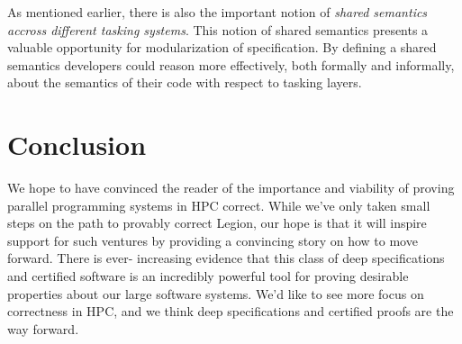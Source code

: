 \documentclass[sigconf]{acmart}
\begin{document}
As mentioned earlier, there is also the important notion of \emph{shared
semantics accross different tasking systems}. This notion of shared semantics
presents a valuable opportunity for modularization of specification. By defining
a shared semantics developers could reason more effectively, both formally and
informally, about the semantics of their code with respect to tasking layers.

\section{Conclusion}

We hope to have convinced the reader of the importance and viability of proving
parallel programming systems in HPC correct. While we've only taken small steps
on the path to provably correct Legion, our hope is that it will inspire
support for such ventures by providing a convincing story on how to move
forward. There is ever- increasing evidence that this class of deep
specifications and certified software is an incredibly powerful tool for
proving desirable properties about our large software systems. We'd like to see
more focus on correctness in HPC, and we think deep specifications and
certified proofs are the way forward.




\end{document}
